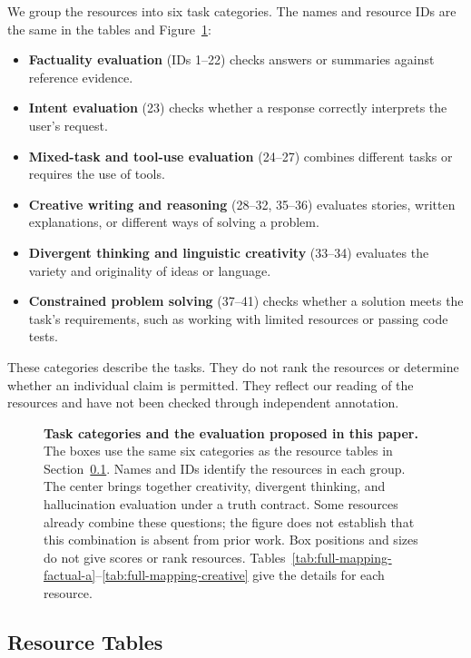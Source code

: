 \documentclass{clv2025}
\begin{document}
We group the resources into six task categories. The names and resource IDs
are the same in the tables and Figure~\ref{fig:profiles}:
\begin{itemize}
\item \textbf{Factuality evaluation} (IDs 1--22) checks answers or summaries
against reference evidence.
\item \textbf{Intent evaluation} (23) checks whether a response correctly
interprets the user's request.
\item \textbf{Mixed-task and tool-use evaluation} (24--27) combines different
tasks or requires the use of tools.
\item \textbf{Creative writing and reasoning} (28--32, 35--36) evaluates
stories, written explanations, or different ways of solving a problem.
\item \textbf{Divergent thinking and linguistic creativity} (33--34)
evaluates the variety and originality of ideas or language.
\item \textbf{Constrained problem solving} (37--41) checks whether a solution
meets the task's requirements, such as working with limited resources or
passing code tests.
\end{itemize}
These categories describe the tasks. They do not rank the resources or
determine whether an individual claim is permitted. They reflect our reading
of the resources and have not been checked through independent annotation.
\begin{figure}[!ht]
\centering
\resizebox{\textwidth}{!}{}
\caption{\textbf{Task categories and the evaluation proposed in this paper.}
The boxes use the same six categories as the resource tables in
Section~\ref{subsec:resource-tables}. Names and IDs identify the resources
in each group. The center brings together creativity, divergent thinking,
and hallucination evaluation under a truth contract. Some resources already
combine these questions; the figure does not establish that this combination
is absent from prior work. Box positions and sizes do not give scores or
rank resources. Tables~\ref{tab:full-mapping-factual-a}--\ref{tab:full-mapping-creative}
give the details for each resource.}
\label{fig:profiles}
\end{figure}
\FloatBarrier

\subsection{Resource Tables}\label{subsec:resource-tables}
\end{document}
